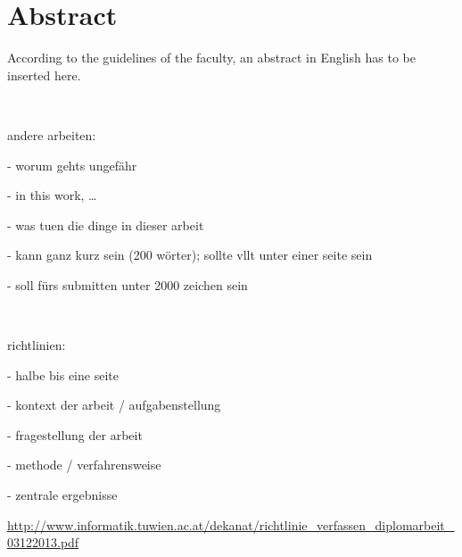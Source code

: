 \chapter*{Abstract}

According to the guidelines of the faculty, an abstract in English has to be inserted here.




~

andere arbeiten:

- worum gehts ungefähr

- in this work, \dots

- was tuen die dinge in dieser arbeit

- kann ganz kurz sein (200 wörter); sollte vllt unter einer seite sein

- soll fürs submitten unter 2000 zeichen sein

~

richtlinien:

- halbe bis eine seite

- kontext der arbeit / aufgabenstellung

- fragestellung der arbeit

- methode / verfahrensweise

- zentrale ergebnisse


\url{http://www.informatik.tuwien.ac.at/dekanat/richtlinie_verfassen_diplomarbeit_03122013.pdf}


